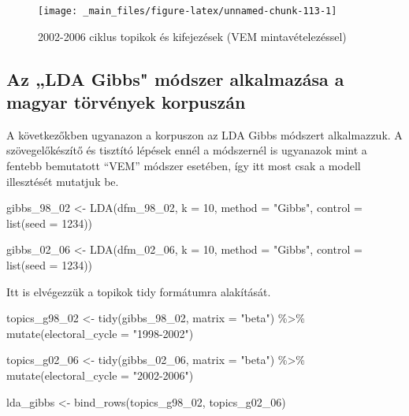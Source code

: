 \documentclass[
]{book}
\newenvironment{Shaded}{\begin{snugshade}}{\end{snugshade}}
\newcommand{\AttributeTok}[1]{\textcolor[rgb]{0.77,0.63,0.00}{#1}}
\newcommand{\DecValTok}[1]{\textcolor[rgb]{0.00,0.00,0.81}{#1}}
\newcommand{\FunctionTok}[1]{\textcolor[rgb]{0.00,0.00,0.00}{#1}}
\newcommand{\NormalTok}[1]{#1}
\newcommand{\OtherTok}[1]{\textcolor[rgb]{0.56,0.35,0.01}{#1}}
\newcommand{\SpecialCharTok}[1]{\textcolor[rgb]{0.00,0.00,0.00}{#1}}
\newcommand{\StringTok}[1]{\textcolor[rgb]{0.31,0.60,0.02}{#1}}
\begin{document}
\begin{figure}

{\centering \texttt{[image: \_main\_files/figure-latex/unnamed-chunk-113-1]} 

}

\caption{2002-2006 ciklus topikok és kifejezések (VEM mintavételezéssel)}\label{fig:unnamed-chunk-113}
\end{figure}

\hypertarget{az-lda-gibbs-muxf3dszer-alkalmazuxe1sa-a-magyar-tuxf6rvuxe9nyek-korpuszuxe1n}{%
\subsection{Az „LDA Gibbs" módszer alkalmazása a magyar törvények
korpuszán}\label{az-lda-gibbs-muxf3dszer-alkalmazuxe1sa-a-magyar-tuxf6rvuxe9nyek-korpuszuxe1n}}

A következőkben ugyanazon a korpuszon az LDA Gibbs módszert alkalmazzuk.
A szövegelőkészítő és tisztító lépések ennél a módszernél is ugyanazok
mint a fentebb bemutatott ``VEM'' módszer esetében, így itt most csak a
modell illesztését mutatjuk be.

\begin{Shaded}
\begin{Highlighting}[]

\NormalTok{gibbs\_98\_02 }\OtherTok{\textless{}{-}} \FunctionTok{LDA}\NormalTok{(dfm\_98\_02, }\AttributeTok{k =} \DecValTok{10}\NormalTok{, }\AttributeTok{method =} \StringTok{"Gibbs"}\NormalTok{, }\AttributeTok{control =} \FunctionTok{list}\NormalTok{(}\AttributeTok{seed =} \DecValTok{1234}\NormalTok{))}

\NormalTok{gibbs\_02\_06 }\OtherTok{\textless{}{-}} \FunctionTok{LDA}\NormalTok{(dfm\_02\_06, }\AttributeTok{k =} \DecValTok{10}\NormalTok{, }\AttributeTok{method =} \StringTok{"Gibbs"}\NormalTok{, }\AttributeTok{control =} \FunctionTok{list}\NormalTok{(}\AttributeTok{seed =} \DecValTok{1234}\NormalTok{))}
\end{Highlighting}
\end{Shaded}

Itt is elvégezzük a topikok tidy formátumra alakítását.

\begin{Shaded}
\begin{Highlighting}[]
\NormalTok{topics\_g98\_02 }\OtherTok{\textless{}{-}} \FunctionTok{tidy}\NormalTok{(gibbs\_98\_02, }\AttributeTok{matrix =} \StringTok{"beta"}\NormalTok{) }\SpecialCharTok{\%\textgreater{}\%}
  \FunctionTok{mutate}\NormalTok{(}\AttributeTok{electoral\_cycle =} \StringTok{"1998{-}2002"}\NormalTok{)}

\NormalTok{topics\_g02\_06 }\OtherTok{\textless{}{-}} \FunctionTok{tidy}\NormalTok{(gibbs\_02\_06, }\AttributeTok{matrix =} \StringTok{"beta"}\NormalTok{) }\SpecialCharTok{\%\textgreater{}\%}
  \FunctionTok{mutate}\NormalTok{(}\AttributeTok{electoral\_cycle =} \StringTok{"2002{-}2006"}\NormalTok{)}

\NormalTok{lda\_gibbs }\OtherTok{\textless{}{-}} \FunctionTok{bind\_rows}\NormalTok{(topics\_g98\_02, topics\_g02\_06)}
\end{Highlighting}
\end{Shaded}
\end{document}
